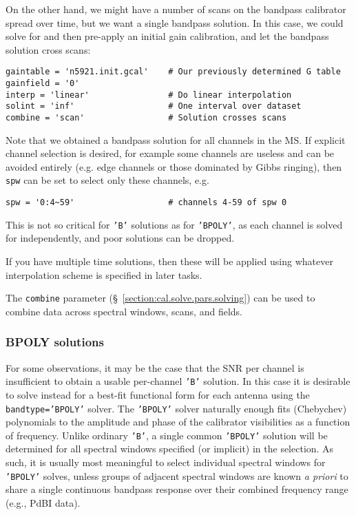 On the other hand, we might have a number of scans on the bandpass
calibrator spread over time, but we want a single bandpass solution.
In this case, we could solve for and then pre-apply an initial gain
calibration, and let the bandpass solution cross scans:
\small
\begin{verbatim}
gaintable = 'n5921.init.gcal'    # Our previously determined G table
gainfield = '0'
interp = 'linear'                # Do linear interpolation
solint = 'inf'                   # One interval over dataset
combine = 'scan'                 # Solution crosses scans
\end{verbatim}
\normalsize

Note that we obtained a bandpass solution for all channels in the MS.
If explicit channel selection is desired, for example some channels 
are useless and can be avoided entirely (e.g. edge channels or those
dominated by Gibbs ringing), then {\tt spw} can be set to select only
these channels, e.g.
\small
\begin{verbatim}
spw = '0:4~59'                   # channels 4-59 of spw 0
\end{verbatim}
\normalsize
This is not so critical for {\tt 'B'} solutions as for {\tt 'BPOLY'},
as each channel is solved for independently, and poor solutions
can be dropped.

If you have multiple time solutions, then these will be applied using
whatever interpolation scheme is specified in later tasks. 

The {\tt combine} parameter (\S~\ref{section:cal.solve.pars.solving}) 
can be used to combine data across spectral windows, scans, and fields.

\subsubsection{BPOLY solutions}
\label{section:cal.solve.band.bpoly}

For some observations, it may be the case that the SNR per channel is
insufficient to obtain a usable per-channel {\tt 'B'} solution.  In this
case it is desirable to solve instead for a best-fit functional form
for each antenna using the {\tt bandtype='BPOLY'} solver. 
The {\tt 'BPOLY'} solver naturally enough fits (Chebychev) polynomials to the
amplitude and phase of the calibrator 
visibilities as a function of frequency.  Unlike ordinary {\tt 'B'}, a
single common {\tt 'BPOLY'} solution will be determined for all spectral
windows specified (or implicit) in the selection.  As
such, it is usually most meaningful to select individual spectral
windows for {\tt 'BPOLY'} solves, unless groups of adjacent spectral windows
are known {\it a priori} to share a single continuous bandpass
response over their combined frequency range (e.g., PdBI data).

